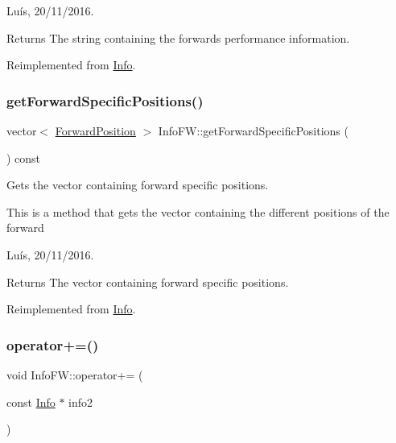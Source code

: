 Luís, 20/11/2016. 

\begin{DoxyReturn}{Returns}
The string containing the forward\textquotesingle{}s performance information. 
\end{DoxyReturn}


Reimplemented from \hyperlink{class_info_a5e52b35a9c17b58222bb57af16c16ce3}{Info}.

\hypertarget{class_info_f_w_a9bce628dbf938dc530f9333d587b100a}{}\label{class_info_f_w_a9bce628dbf938dc530f9333d587b100a} 
\subsubsection{\texorpdfstring{get\+Forward\+Specific\+Positions()}{getForwardSpecificPositions()}}
{\footnotesize\ttfamily vector$<$ \hyperlink{_utils_8hpp_ae6ffae6f01bd3312aac4a44642f14620}{Forward\+Position} $>$ Info\+F\+W\+::get\+Forward\+Specific\+Positions (\begin{DoxyParamCaption}{ }\end{DoxyParamCaption}) const\hspace{0.3cm}{\ttfamily [virtual]}}



Gets the vector containing forward specific positions. 

This is a method that gets the vector containing the different positions of the forward

Luís, 20/11/2016. 

\begin{DoxyReturn}{Returns}
The vector containing forward specific positions. 
\end{DoxyReturn}


Reimplemented from \hyperlink{class_info_abff2f6cd7a845b8bd80c97d9d456e07e}{Info}.

\hypertarget{class_info_f_w_aa4819d4c6348908eee81e5e71552cf8d}{}\label{class_info_f_w_aa4819d4c6348908eee81e5e71552cf8d} 
\subsubsection{\texorpdfstring{operator+=()}{operator+=()}}
{\footnotesize\ttfamily void Info\+F\+W\+::operator+= (\begin{DoxyParamCaption}\item[{const \hyperlink{class_info}{Info} $\ast$}]{info2 }\end{DoxyParamCaption})\hspace{0.3cm}{\ttfamily [virtual]}}



